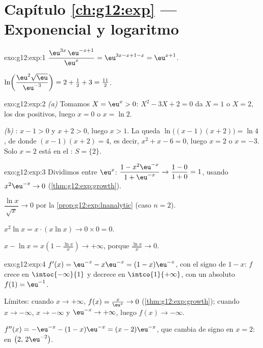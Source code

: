 \section*{Capítulo \ref{ch:g12:exp} --- Exponencial y logaritmo}

\begin{solution}{exo:g12:exp:1}
$\dfrac{\eu^{3x}\,\eu^{-x+1}}{\eu^{x}} = \eu^{3x - x + 1 - x} = \eu^{x+1}$.

$\ln\!\left(\dfrac{\eu^2\sqrt{\eu}}{\eu^{-3}}\right)
= 2 + \tfrac12 + 3 = \tfrac{11}{2}$.
\end{solution}

\begin{solution}{exo:g12:exp:2}
\emph{(a)} Tomamos $X = \eu^x > 0$: $X^2 - 3X + 2 = 0$ da $X = 1$ o
$X = 2$, los dos positivos, luego $x = 0$ o $x = \ln 2$.

\emph{(b)} : $x - 1 > 0$ y $x + 2 > 0$, luego $x > 1$. La 
queda $\ln\bigl((x-1)(x+2)\bigr) = \ln 4$, de donde $(x-1)(x+2) = 4$, es
decir, $x^2 + x - 6 = 0$, luego $x = 2$ o $x = -3$. Solo $x = 2$ está en el
: $S = \{2\}$.
\end{solution}

\begin{solution}{exo:g12:exp:3}
Dividimos entre $\eu^x$:
$\dfrac{1 - x^2\eu^{-x}}{1 + \eu^{-x}} \to \dfrac{1-0}{1+0} = 1$, usando
$x^2 \eu^{-x} \to 0$ (\cref{thm:g12:exp:growth}).

$\dfrac{\ln x}{\sqrt x} \to 0$ por la \cref{prop:g12:exp:lnanalytic} (caso
$n = 2$).

$x^2 \ln x = x \cdot (x \ln x) \to 0 \times 0 = 0$.

$x - \ln x = x\left(1 - \frac{\ln x}{x}\right) \to +\infty$, porque
$\frac{\ln x}{x} \to 0$.
\end{solution}

\begin{solution}{exo:g12:exp:4}
$f'(x) = \eu^{-x} - x\eu^{-x} = (1 - x)\eu^{-x}$, con el signo de $1 - x$:
$f$ crece en $\intoc{-\infty}{1}$ y decrece en $\intco{1}{+\infty}$, con un
 absoluto $f(1) = \eu^{-1}$.

Límites: cuando $x \to +\infty$, $f(x) = \frac{x}{\eu^x} \to 0$
(\cref{thm:g12:exp:growth}); cuando $x \to -\infty$, $x \to -\infty$ y
$\eu^{-x} \to +\infty$, luego $f(x) \to -\infty$.

$f''(x) = -\eu^{-x} - (1-x)\eu^{-x} = (x - 2)\eu^{-x}$, que cambia de signo
en $x = 2$:  en $\bigl(2,\, 2\eu^{-2}\bigr)$.
\end{solution}

